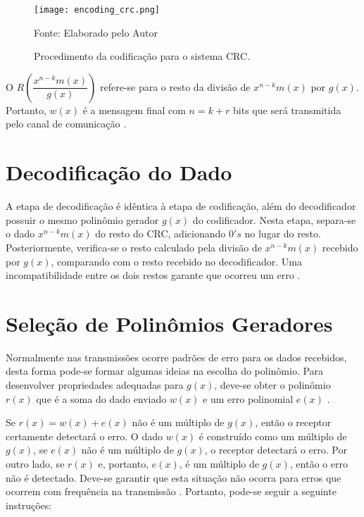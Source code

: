 \begin{figure}[H]
	\caption{\label{encoding_crc}Procedimento da codificação para o sistema CRC.}
	\centering
	\texttt{[image: encoding\_crc.png]}
	\begin{center}
		Fonte: Elaborado pelo Autor
	\end{center}	
\end{figure}

O $R{(\dfrac{x^{n−k}m(x)}{g(x)})}$ refere-se para o resto da divisão de $x^{n − k}m(x)$ por $g(x)$. Portanto, $w(x)$ é a mensagem final com $n = k + r$ bits que será transmitida pelo canal de comunicação \cite{Tridib2004}.

\section{Decodificação do Dado}

A etapa de decodificação é idêntica à etapa de codificação, além do decodificador possuir o mesmo polinômio gerador $g(x)$ do codificador. Nesta etapa, separa-se o dado $x^{n − k}m(x)$ do resto do CRC, adicionando $0's$ no lugar do resto. Posteriormente, verifica-se o resto calculado pela divisão de $x^{n − k}m(x)$ recebido por $g(x)$, comparando com o resto recebido no decodificador. Uma incompatibilidade entre os dois restos garante que ocorreu um erro \cite{Tridib2004}.

\section{Seleção de Polinômios Geradores} \label{poli:gerador}

Normalmente nas transmissões ocorre padrões de erro para os dados recebidos, desta forma pode-se formar algumas ideias na escolha do polinômio. Para desenvolver propriedades adequadas para $g(x)$, deve-se obter o polinômio $r(x)$ que é a soma do dado enviado $w(x)$ e um erro polinomial $e(x)$ \cite{Tridib2004}.

Se $r(x) = w(x) + e(x)$ não é um múltiplo de $g(x)$, então o receptor certamente detectará o erro. O dado $w(x)$ é construído como um múltiplo de $g(x)$, se $e(x)$ não é um múltiplo de $g(x)$, o receptor detectará o erro. Por outro lado, se $r(x)$ e, portanto, $e(x)$, é um múltiplo de $g(x)$, então o erro não é detectado. Deve-se garantir que esta situação não ocorra para erros que ocorrem com frequência na transmissão \cite{Tridib2004}
. Portanto, pode-se seguir a seguinte instruções:


